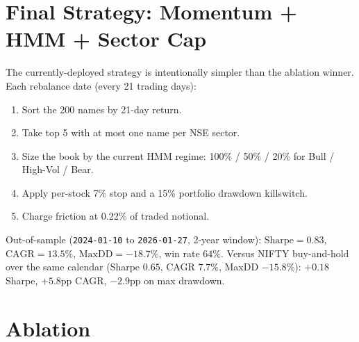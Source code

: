 \documentclass[conference]{IEEEtran}
\begin{document}
\section{Final Strategy: Momentum + HMM + Sector Cap}
The currently-deployed strategy is intentionally simpler than the ablation
winner. Each rebalance date (every 21 trading days):
\begin{enumerate}
\item Sort the 200 names by 21-day return.
\item Take top 5 with at most one name per NSE sector.
\item Size the book by the current HMM regime: 100\% / 50\% / 20\%
      for Bull / High-Vol / Bear.
\item Apply per-stock 7\% stop and a 15\% portfolio drawdown killswitch.
\item Charge friction at 0.22\% of traded notional.
\end{enumerate}
Out-of-sample (\texttt{2024-01-10} to \texttt{2026-01-27}, 2-year window):
$\mathrm{Sharpe} = 0.83$, $\mathrm{CAGR} = 13.5\%$,
$\mathrm{MaxDD} = -18.7\%$, win rate $64\%$. Versus NIFTY buy-and-hold over
the same calendar (Sharpe $0.65$, CAGR $7.7\%$, MaxDD $-15.8\%$): $+0.18$
Sharpe, $+5.8$pp CAGR, $-2.9$pp on max drawdown.

\section{Ablation}
\end{document}
